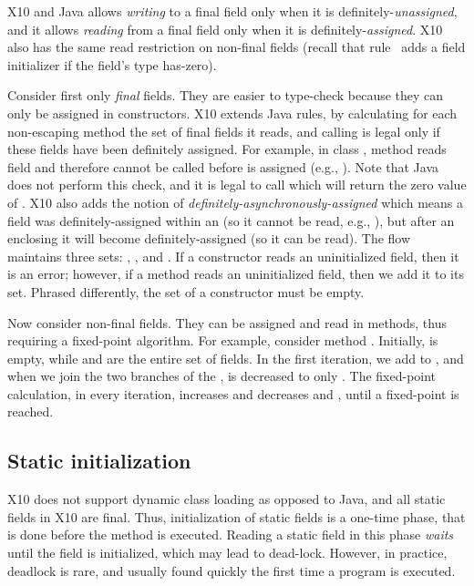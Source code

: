 X10 and Java allows \emph{writing} to a final field only when it is definitely-\emph{unassigned},
    and it allows \emph{reading} from a final field only when it is definitely-\emph{assigned}.
X10 also has the same read restriction on non-final fields
    (recall that rule~ adds a field initializer if the field's type has-zero).


Consider first only \emph{final} fields.
    They are easier to type-check because they can only be assigned in constructors.
X10 extends Java rules,
    by calculating for each non-escaping method  the set of final fields it reads,
    and calling  is legal only if these fields have been definitely assigned.
For example, in class , method  reads field 
    and therefore cannot be called before  is assigned (e.g., ).
Note that Java does not perform this check, and it is legal to call 
    which will return the zero value of .
X10 also adds the notion of \emph{definitely-asynchronously-assigned}
    which means a field was definitely-assigned within an 
    (so it cannot be read, e.g., ),
    but after an enclosing  it will become definitely-assigned
    (so it can be read).
The flow maintains three sets:
    , , and .
If a constructor
    reads an uninitialized field, then it is an error;
    however, if a method reads an uninitialized field, then we add it to its  set.
Phrased differently, the  set of a constructor must be empty.

Now consider non-final fields.
    They can be assigned and read in methods,
        thus requiring a fixed-point algorithm.
For example, consider method .
Initially,  is empty,
    while  and  are the entire set of fields.
In the first iteration, we add  to ,
    and when we join the two branches of the ,
     is decreased to only .
The fixed-point calculation, in every iteration, increases 
    and decreases  and ,
    until a fixed-point is reached.


\subsection{Static initialization}
X10 does not support dynamic class loading as opposed to Java,
    and all static fields in X10 are final.
Thus, initialization of static fields is a one-time phase, %
    that is done before the  method is executed.
Reading a static field in this phase \emph{waits} until the field is initialized,
    which may lead to dead-lock.
However, in practice, deadlock is rare,
    and usually found quickly the first time a program is executed.

